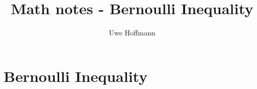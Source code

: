 

\title{Math notes - Bernoulli Inequality}
\author{Uwe Hoffmann}




\setcounter{chapter}{1}
\chapter*{Bernoulli Inequality}
